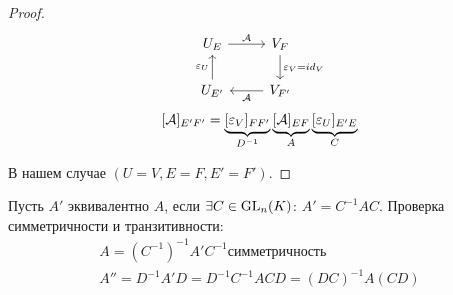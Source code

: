 \documentclass[main]{subfiles}
\begin{document}
\begin{proof}
    \[\begin{tikzcd}[ampersand replacement=\&]
            {U_E} \& {V_F} \\
            {U_{E'}} \& {V_{F'}}
            \arrow["{\epsilon_V=id_V}", from=1-2, to=2-2]
            \arrow["{\mca}", from=2-2, to=2-1]
            \arrow["{\epsilon_U}", from=2-1, to=1-1]
            \arrow["{\mca}", from=1-1, to=1-2]
        \end{tikzcd}\]
    \[[\mathcal{A}]_{E'F'}=\underbrace{[\varepsilon_V]_{FF'}}_{D^{-1}}\underbrace{[\mathcal{A}]_{EF}}_{A}\underbrace{[\varepsilon_U]_{E'E}}_{C}\]

    В нашем случае $(U=V, E=F, E'=F')$.
\end{proof}

\begin{definition} 
    Пусть $A'$ эквивалентно $A$, если $\exists C \in \operatorname{GL}_n(K)$: $A'=C^{-1}AC$.
    Проверка симметричности и транзитивности:
    \begin{gather*}
        A= (C^{-1})^{-1}A'C^{-1} симметричность \\
        A'' = D^{-1}A'D=D^{-1}C^{-1}ACD=(DC)^{-1}A(CD)  \\
    \end{gather*}
\end{definition}
\end{document}
